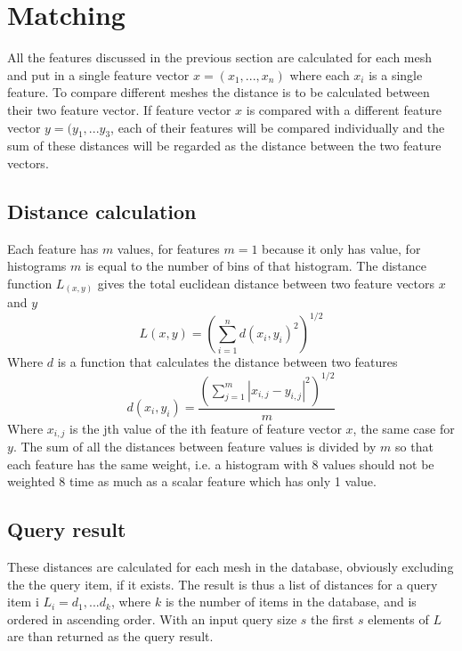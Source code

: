 \documentclass{bigdata}
\begin{document}
\section{Matching}
All the features discussed in the previous section are calculated for each mesh and put in a single feature vector $x = (x_1,...,x_n)$ where each $x_i$ is a single feature. To compare different meshes the distance is to be calculated between their two feature vector. If feature vector $x$ is compared with a different feature vector $y = (y_1,...y_3$, each of their features will be compared individually and the sum of these distances will be regarded as the distance between the two feature vectors.

\subsection{Distance calculation}
Each feature has $m$ values, for  features $m = 1$ because it only has value, for histograms $m$ is equal to the number of bins of that histogram. The distance function $L_(x,y)$ gives the total euclidean distance between two feature vectors $x$ and $y$
\begin{equation}
L(x,y) = \left(\sum\limits_{i=1}^nd(x_i,y_i)^2\right)^{1/2}
\end{equation}
Where $d$ is a function that calculates the distance between two features
\begin{equation}
d(x_i,y_i) = \frac{\left(\sum\limits_{j=1}^m|x_{i,j}-y_{i,j}|^2\right)^{1/2}}{m}
\end{equation}
Where $x_{i,j}$ is the jth value of the ith feature of feature vector $x$, the same case for $y$. The sum of all the distances between feature values is divided by $m$ so that each feature has the same weight, i.e. a histogram with 8 values should not be weighted 8 time as much as a scalar feature which has only 1 value.  

\subsection{Query result}
These distances are calculated for each mesh in the database, obviously excluding the the query item, if it exists. The result is thus a list of distances for a query item i $L_i = {d_1, ... d_k}$, where $k$ is the number of items in the database, and is ordered in ascending order. With an input query size $s$ the first $s$ elements of $L$ are than returned as the query result.
\end{document}
